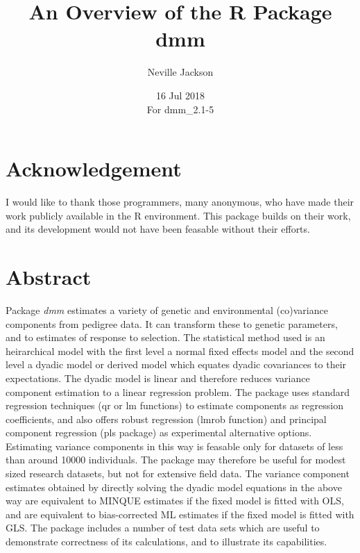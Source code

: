 \documentclass[titlepage]{article}  %
\title{ An Overview of the R Package dmm}
\author{Neville Jackson }
\date{16 Jul 2018 \\
      For dmm\_2.1-5}   %
\begin{document}
 
 
\maketitle      
\tableofcontents

\clearpage
\section{Acknowledgement}
 I would like to thank those programmers, many anonymous, who have made their work
publicly available in the R environment. This package builds on their work, and its
 development would not have been feasable without their efforts.

\clearpage
\section{Abstract}
 Package {\em dmm} estimates a variety of genetic and environmental (co)variance
components from pedigree data. It can transform these to genetic parameters, and to estimates of response to selection. The statistical method used is an heirarchical model with the first level a normal fixed effects model and the second level a dyadic model or derived model which equates dyadic covariances to their expectations. The dyadic model is linear and therefore reduces variance component estimation to a linear regression problem. 
The package uses standard regression techniques (qr or lm functions) to estimate components as regression coefficients, and also offers robust regression (lmrob function) and principal component regression (pls package) as experimental alternative options.
Estimating variance components in this way is feasable only for datasets of less than around 10000 individuals. The package may therefore be useful for modest sized research datasets, but not for extensive field data. The variance component estimates obtained by directly solving the dyadic model equations in the above way are equivalent to MINQUE estimates if the fixed model is fitted with OLS, and are equivalent to bias-corrected ML estimates if the fixed model is fitted with GLS. The package includes a number of test data sets which are useful to demonstrate correctness of its calculations, and to illustrate its capabilities.

\clearpage
\end{document}

